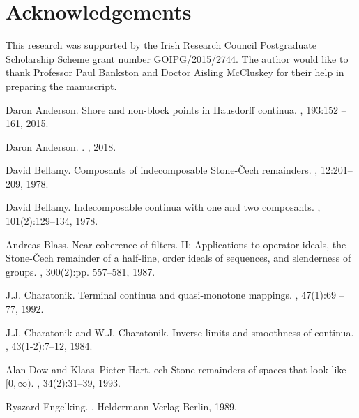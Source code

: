 \documentclass[12pt]{article}
\theoremstyle{plain}
\theoremstyle{definition}
\newcommand{\0}{\ensuremath{\varnothing}}
\begin{document}
	\section*{Acknowledgements}
	This research was supported by the Irish Research Council Postgraduate Scholarship Scheme grant number GOIPG/2015/2744. 
	The author would like to thank Professor Paul Bankston and Doctor Aisling McCluskey for their help in preparing the manuscript. 
	\begin{thebibliography}{10}
		
		Daron Anderson.
		\newblock Shore and non-block points in {H}ausdorff continua.
		, 193:152 -- 161, 2015.
		
		Daron Anderson.
		.
		, 2018.
		
		David Bellamy.
		\newblock Composants of indecomposable {S}tone-\v{C}ech remainders.
		, 12:201--209, 1978.
		
		David Bellamy.
		\newblock Indecomposable continua with one and two composants.
		, 101(2):129--134, 1978.
		
		Andreas Blass.
		\newblock Near coherence of filters. {II}: Applications to operator ideals, the
		{S}tone-\v{C}ech remainder of a half-line, order ideals of sequences, and
		slenderness of groups.
		, 300(2):pp.
		557--581, 1987.
		
		J.J. Charatonik.
		\newblock Terminal continua and quasi-monotone mappings.
		, 47(1):69 -- 77, 1992.
		
		J.J. Charatonik and W.J. Charatonik.
		\newblock Inverse limits and smoothness of continua.
		, 43(1-2):7--12, 1984.
		
		Alan Dow and Klaas~Pieter Hart.
		ech-{S}tone remainders of spaces that look like {$[0,\infty)$}.
		,
		34(2):31--39, 1993.
		
		Ryszard Engelking.
		.
		\newblock Heldermann Verlag Berlin, 1989.
		

\end{thebibliography}
\end{document}

